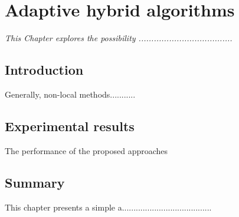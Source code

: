 \chapter{Adaptive hybrid algorithms}
\label{C6} %
\graphicspath{{Figures/Chapter-6figs/PDF/}{Figures/Chapter-6figs/}}
\textit{This Chapter explores the possibility .....................................}
\section{Introduction} \label{S6.1}
Generally, non-local methods...........
\section{Experimental results} \label{S6.4}
 The performance of the proposed approaches 
\section{Summary}
This chapter presents a simple a.......................................